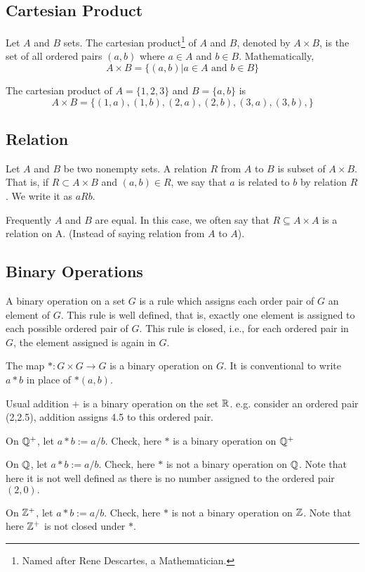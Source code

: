 \subsection{Cartesian Product}

Let $A$ and $B$ sets. The cartesian product\footnote{Named after Rene Descartes, a Mathematician.} of $A$ and $B$, denoted by $A \times B$, is the set of all ordered pairs $(a,b)$ where $a \in A$ and $b \in B$. Mathematically,
\[A \times B = \{(a,b)| a \in A \text{ and } b \in B\}\]
\begin{ex}
 The cartesian product of $A=\{1,2,3\}$ and $B=\{a,b\}$ is
\[A \times B = \{(1,a),(1,b),(2,a),(2,b),(3,a),(3,b),\}\]
\end{ex}

\subsection{Relation} Let $A$ and $B$ be two nonempty sets. A relation $R$ from $A$ to $B$ is subset of $A \times B$. That is, if $R \subset A \times B$ and $(a,b) \in R$, we say that $a$ is related to $b$ by relation $R$. We write it as $aRb$. 

Frequently $A$ and $B$ are equal. In  this case, we often say that $R \subseteq A \times A$ is a relation on A. (Instead of saying relation from $A$ to $A$).
\subsection{Binary Operations}
\begin{defn}
A binary operation on a set $G$ is a rule which assigns each order pair of
$G$ an element of $G$. 
This rule is well defined, that is, exactly one element is assigned to each possible ordered pair of $G$.
This rule is closed, i.e., for each ordered pair in $G$, the element assigned
is again in $G$.
\end{defn}

The map $*:G\times G \to G$ is a binary operation on $G$. It is conventional to write $a*b$ in place of $*(a,b)$.

\begin{ex}
Usual addition $+$ is a binary operation on the set $\mathbb R$. e.g. consider an
ordered pair (2,2.5), addition assigns 4.5 to this ordered pair. 
\end{ex}
\begin{ex}
On $\mathbb Q^+$, let $a*b:=a/b$. Check, here $*$ is a binary operation on $\mathbb Q^+$
\end{ex}
\begin{ex}
On $\mathbb Q$, let $a*b:=a/b$. Check, here $*$ is not a binary operation on $\mathbb Q$.
Note that here it is not well defined as there is no number assigned to the
ordered pair $(2,0).$
\end{ex}
\begin{ex}
On $\mathbb Z^+$, let $a*b:=a/b$. Check, here $*$ is not a binary operation on $\mathbb Z$.
Note that here $\mathbb Z^+$ is not closed  under $*$.
\end{ex}

